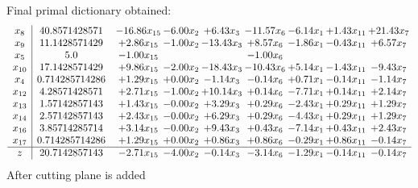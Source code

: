 \documentclass[8pt]{article}
\begin{document}
 Final primal dictionary obtained: 
\[\begin{array}{c| c c@{\hskip 2pt} c@{\hskip 2pt} c@{\hskip 2pt} c@{\hskip 2pt} c@{\hskip 2pt} c@{\hskip 2pt} c@{\hskip 2pt} }
 x_{8}   &  40.8571428571 & -16.86 x_{15} & -6.00 x_{2} & +  6.43 x_{3} & -11.57 x_{6} & -6.14 x_{1} & +  1.43 x_{11} & + 21.43 x_{7}\\
 x_{9}   &  11.1428571429 & +  2.86 x_{15} & -1.00 x_{2} & -13.43 x_{3} & +  8.57 x_{6} & -1.86 x_{1} & -0.43 x_{11} & +  6.57 x_{7}\\
 x_{5}   &  5.0 & -1.00 x_{15} &    &   & -1.00 x_{6} &    &    &   \\
 x_{10}   &  17.1428571429 & +  9.86 x_{15} & -2.00 x_{2} & -18.43 x_{3} & -10.43 x_{6} & +  5.14 x_{1} & -1.43 x_{11} & -9.43 x_{7}\\
 x_{4}   &  0.714285714286 & +  1.29 x_{15} & +  0.00 x_{2} & -1.14 x_{3} & -0.14 x_{6} & +  0.71 x_{1} & -0.14 x_{11} & -1.14 x_{7}\\
 x_{12}   &  4.28571428571 & +  2.71 x_{15} & -1.00 x_{2} & + 10.14 x_{3} & +  0.14 x_{6} & -7.71 x_{1} & +  0.14 x_{11} & +  2.14 x_{7}\\
 x_{13}   &  1.57142857143 & +  1.43 x_{15} & -0.00 x_{2} & +  3.29 x_{3} & +  0.29 x_{6} & -2.43 x_{1} & +  0.29 x_{11} & +  1.29 x_{7}\\
 x_{14}   &  2.57142857143 & +  2.43 x_{15} & -0.00 x_{2} & +  6.29 x_{3} & +  0.29 x_{6} & -4.43 x_{1} & +  0.29 x_{11} & +  1.29 x_{7}\\
 x_{16}   &  3.85714285714 & +  3.14 x_{15} & -0.00 x_{2} & +  9.43 x_{3} & +  0.43 x_{6} & -7.14 x_{1} & +  0.43 x_{11} & +  2.43 x_{7}\\
 x_{17}   &  0.714285714286 & +  1.29 x_{15} & +  0.00 x_{2} & +  0.86 x_{3} & +  0.86 x_{6} & -0.29 x_{1} & +  0.86 x_{11} & -0.14 x_{7}\\
\hline
z    &  20.7142857143 & -2.71 x_{15} & -4.00 x_{2} & -0.14 x_{3} & -3.14 x_{6} & -1.29 x_{1} & -0.14 x_{11} & -0.14 x_{7}\\
\end{array}\]
 After cutting plane is added 
\end{document}
